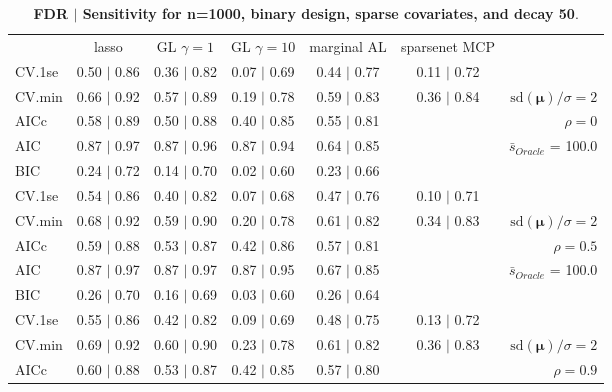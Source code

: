\begin{table}\vspace{-.5cm}
\caption[l]{ {\it }
{ \bf FDR $\boldsymbol{\mid}$ Sensitivity for n=1000, binary design, sparse covariates, and  decay  50}.}
\vspace{-.5cm}
\footnotesize{}
\begin{center}
\begin{tabular}{l*{5}{c}|r}
 & lasso & GL $\gamma=1$ & GL $\gamma=10$ & marginal AL & sparsenet MCP  & \\
 \cline{1-7}
CV.1se & 0.50 $\mid$ 0.86 & 0.36 $\mid$ 0.82 & 0.07 $\mid$ 0.69 & 0.44 $\mid$ 0.77 & 0.11 $\mid$ 0.72 & \\
CV.min & 0.66 $\mid$ 0.92 & 0.57 $\mid$ 0.89 & 0.19 $\mid$ 0.78 & 0.59 $\mid$ 0.83 & 0.36 $\mid$ 0.84 &  $\mathrm{sd}(\mathbf{\mu})/\sigma=2$ \\
AICc & 0.58 $\mid$ 0.89 & 0.50 $\mid$ 0.88 & 0.40 $\mid$ 0.85 & 0.55 $\mid$ 0.81 & & $\rho=0$ \\
AIC & 0.87 $\mid$ 0.97 & 0.87 $\mid$ 0.96 & 0.87 $\mid$ 0.94 & 0.64 $\mid$ 0.85 & &  \multirow{2}{*}{$\bar{s}_{Oracle}$ = 100.0} \\
BIC & 0.24 $\mid$ 0.72 & 0.14 $\mid$ 0.70 & 0.02 $\mid$ 0.60 & 0.23 $\mid$ 0.66 & &  \\
 \hline 
CV.1se & 0.54 $\mid$ 0.86 & 0.40 $\mid$ 0.82 & 0.07 $\mid$ 0.68 & 0.47 $\mid$ 0.76 & 0.10 $\mid$ 0.71 & \\
CV.min & 0.68 $\mid$ 0.92 & 0.59 $\mid$ 0.90 & 0.20 $\mid$ 0.78 & 0.61 $\mid$ 0.82 & 0.34 $\mid$ 0.83 &  $\mathrm{sd}(\mathbf{\mu})/\sigma=2$ \\
AICc & 0.59 $\mid$ 0.88 & 0.53 $\mid$ 0.87 & 0.42 $\mid$ 0.86 & 0.57 $\mid$ 0.81 & & $\rho=0.5$ \\
AIC & 0.87 $\mid$ 0.97 & 0.87 $\mid$ 0.97 & 0.87 $\mid$ 0.95 & 0.67 $\mid$ 0.85 & &  \multirow{2}{*}{$\bar{s}_{Oracle}$ = 100.0} \\
BIC & 0.26 $\mid$ 0.70 & 0.16 $\mid$ 0.69 & 0.03 $\mid$ 0.60 & 0.26 $\mid$ 0.64 & &  \\
 \hline 
CV.1se & 0.55 $\mid$ 0.86 & 0.42 $\mid$ 0.82 & 0.09 $\mid$ 0.69 & 0.48 $\mid$ 0.75 & 0.13 $\mid$ 0.72 & \\
CV.min & 0.69 $\mid$ 0.92 & 0.60 $\mid$ 0.90 & 0.23 $\mid$ 0.78 & 0.61 $\mid$ 0.82 & 0.36 $\mid$ 0.83 &  $\mathrm{sd}(\mathbf{\mu})/\sigma=2$ \\
AICc & 0.60 $\mid$ 0.88 & 0.53 $\mid$ 0.87 & 0.42 $\mid$ 0.85 & 0.57 $\mid$ 0.80 & & $\rho=0.9$ \\

\end{tabular}
\end{center}
\end{table}
